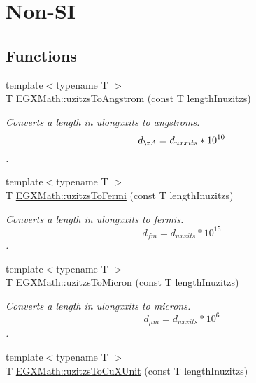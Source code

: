 \hypertarget{group___e_g_x_math-_conversions-_length_conversions-uzitzs-_non-_s_i}{}\section{Non-\/\+SI}
\label{group___e_g_x_math-_conversions-_length_conversions-uzitzs-_non-_s_i}
\subsection*{Functions}
\begin{DoxyCompactItemize}
\item 
{\footnotesize template$<$typename T $>$ }\\T \mbox{\hyperlink{group___e_g_x_math-_conversions-_length_conversions-uzitzs-_non-_s_i_gaaaecee65b1db5abcc71e18526e7073eb}{E\+G\+X\+Math\+::uzitzs\+To\+Angstrom}} (const T length\+Inuzitzs)
\begin{DoxyCompactList}\small\item\em Converts a length in ulongxxits to angstroms. \[ d_{\AA}=d_{uxxits} * 10^{10} \]. \end{DoxyCompactList}\item 
{\footnotesize template$<$typename T $>$ }\\T \mbox{\hyperlink{group___e_g_x_math-_conversions-_length_conversions-uzitzs-_non-_s_i_ga920cd8aae6bc9f70faa49a6a5c988040}{E\+G\+X\+Math\+::uzitzs\+To\+Fermi}} (const T length\+Inuzitzs)
\begin{DoxyCompactList}\small\item\em Converts a length in ulongxxits to fermis. \[ d_{fm}=d_{uxxits} * 10^{15} \]. \end{DoxyCompactList}\item 
{\footnotesize template$<$typename T $>$ }\\T \mbox{\hyperlink{group___e_g_x_math-_conversions-_length_conversions-uzitzs-_non-_s_i_ga695a8fd8870537930d6378e99ad2aa9f}{E\+G\+X\+Math\+::uzitzs\+To\+Micron}} (const T length\+Inuzitzs)
\begin{DoxyCompactList}\small\item\em Converts a length in ulongxxits to microns. \[ d_{\mu m}=d_{uxxits} * 10^{6} \]. \end{DoxyCompactList}\item 
{\footnotesize template$<$typename T $>$ }\\T \mbox{\hyperlink{group___e_g_x_math-_conversions-_length_conversions-uzitzs-_non-_s_i_gab25470e41b88c41d4bf32622baa6c472}{E\+G\+X\+Math\+::uzitzs\+To\+Cu\+X\+Unit}} (const T length\+Inuzitzs)

\end{DoxyCompactItemize}
